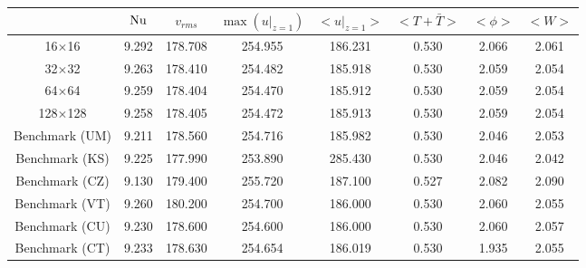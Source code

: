 \begin{tabular}{c|ccccccc}
    & $\mathrm{Nu}$ & $v_{rms}$ & $\max(u|_{z=1})$ & $<u|_{z=1}>$ & $<T + \bar{T}>$ & $<\phi>$ & $<W>$ \\
\hline
16$\times$16 & 9.292 & 178.708 & 254.955 & 186.231 & 0.530 & 2.066 & 2.061 \\
32$\times$32 & 9.263 & 178.410 & 254.482 & 185.918 & 0.530 & 2.059 & 2.054 \\
64$\times$64 & 9.259 & 178.404 & 254.470 & 185.912 & 0.530 & 2.059 & 2.054 \\
128$\times$128 & 9.258 & 178.405 & 254.472 & 185.913 & 0.530 & 2.059 & 2.054 \\
\hline
Benchmark (UM) & 9.211 & 178.560 & 254.716 & 185.982 & 0.530 & 2.046 & 2.053 \\
Benchmark (KS) & 9.225 & 177.990 & 253.890 & 285.430 & 0.530 & 2.046 & 2.042 \\
Benchmark (CZ) & 9.130 & 179.400 & 255.720 & 187.100 & 0.527 & 2.082 & 2.090 \\
Benchmark (VT) & 9.260 & 180.200 & 254.700 & 186.000 & 0.530 & 2.060 & 2.055 \\
Benchmark (CU) & 9.230 & 178.600 & 254.600 & 186.000 & 0.530 & 2.060 & 2.057 \\
Benchmark (CT) & 9.233 & 178.630 & 254.654 & 186.019 & 0.530 & 1.935 & 2.055 \\
\end{tabular}
